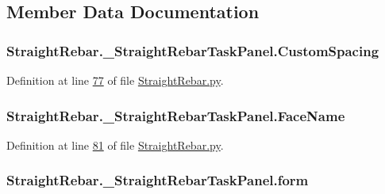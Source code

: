 \subsection{Member Data Documentation}
\subsubsection[{\texorpdfstring{Custom\+Spacing}{CustomSpacing}}]{\setlength{\rightskip}{0pt plus 5cm}Straight\+Rebar.\+\_\+\+Straight\+Rebar\+Task\+Panel.\+Custom\+Spacing}\hypertarget{classStraightRebar_1_1__StraightRebarTaskPanel_a91d60c0007437af93af933a29c66a963}{}\label{classStraightRebar_1_1__StraightRebarTaskPanel_a91d60c0007437af93af933a29c66a963}


Definition at line \hyperlink{StraightRebar_8py_source_l00077}{77} of file \hyperlink{StraightRebar_8py_source}{Straight\+Rebar.\+py}.

\subsubsection[{\texorpdfstring{Face\+Name}{FaceName}}]{\setlength{\rightskip}{0pt plus 5cm}Straight\+Rebar.\+\_\+\+Straight\+Rebar\+Task\+Panel.\+Face\+Name}\hypertarget{classStraightRebar_1_1__StraightRebarTaskPanel_afe733532cc15a149f9ba8f7da4515413}{}\label{classStraightRebar_1_1__StraightRebarTaskPanel_afe733532cc15a149f9ba8f7da4515413}


Definition at line \hyperlink{StraightRebar_8py_source_l00081}{81} of file \hyperlink{StraightRebar_8py_source}{Straight\+Rebar.\+py}.

\subsubsection[{\texorpdfstring{form}{form}}]{\setlength{\rightskip}{0pt plus 5cm}Straight\+Rebar.\+\_\+\+Straight\+Rebar\+Task\+Panel.\+form}\hypertarget{classStraightRebar_1_1__StraightRebarTaskPanel_a88b76fa56bfa51be091abb0cde42a0e0}{}\label{classStraightRebar_1_1__StraightRebarTaskPanel_a88b76fa56bfa51be091abb0cde42a0e0}


